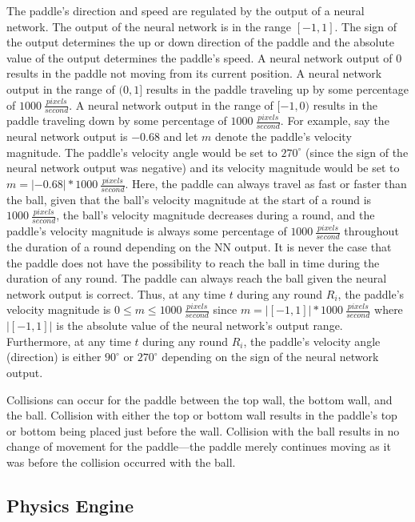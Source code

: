 The paddle's direction and speed are regulated by the output of a neural network. The output of the neural network is in the range $[-1,1]$. The sign of the output determines the up or down direction of the paddle and the absolute value of the output determines the paddle's speed. A neural network output of $0$ results in the paddle not moving from its current position. A neural network output in the range of $(0,1]$ results in the paddle traveling up by some percentage of $1000 \ \frac{pixels}{second}$. A neural network output in the range of $[-1,0)$ results in the paddle traveling down by some percentage of $1000 \ \frac{pixels}{second}$. For example, say the neural network output is $-0.68$ and let $m$ denote the paddle's velocity magnitude. The paddle's velocity angle would be set to $270^\circ$ (since the sign of the neural network output was negative) and its velocity magnitude would be set to $m=|-0.68|*1000 \ \frac{pixels}{second}$. Here, the paddle can always travel as fast or faster than the ball, given that the ball's velocity magnitude at the start of a round is $1000 \ \frac{pixels}{second}$, the ball's velocity magnitude decreases during a round, and the paddle's velocity magnitude is always some percentage of $1000 \ \frac{pixels}{second}$ throughout the duration of a round depending on the NN output. It is never the case that the paddle does not have the possibility to reach the ball in time during the duration of any round. The paddle can always reach the ball given the neural network output is correct. Thus, at any time $t$ during any round $R_i$, the paddle's velocity magnitude is $0\leq m \leq 1000 \ \frac{pixels}{second}$ since $m = \left|[-1,1]\right| * 1000 \ \frac{pixels}{second}$ where $\left|[-1,1]\right|$ is the absolute value of the neural network's output range. Furthermore, at any time $t$ during any round $R_i$, the paddle's velocity angle (direction) is either $90^\circ$ or $270^\circ$ depending on the sign of the neural network output.     

Collisions can occur for the paddle between the top wall, the bottom wall, and the ball. Collision with either the top or bottom wall results in the paddle's top or bottom being placed just before the wall. Collision with the ball results in no change of movement for the paddle---the paddle merely continues moving as it was before the collision occurred with the ball.

\subsection{Physics Engine}

